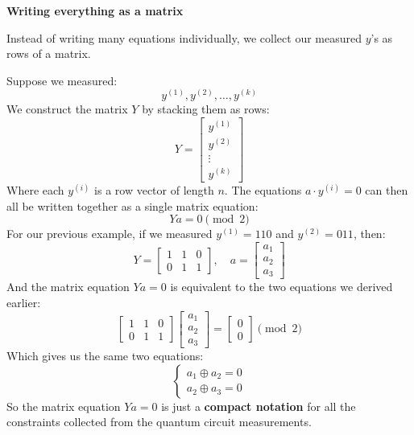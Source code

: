 \highspace
\begin{flushleft}
    \textcolor{Green3}{ \textbf{Writing everything as a matrix}}
\end{flushleft}
Instead of writing many equations individually, we collect our measured $y$'s as rows of a matrix.

\highspace
Suppose we measured:
\begin{equation*}
    y^{(1)}, y^{(2)}, \dots, y^{(k)}
\end{equation*}
We construct the matrix $Y$ by stacking them as rows:
\begin{equation*}
    Y =
    \begin{bmatrix}
        y^{(1)} \\
        y^{(2)} \\
        \vdots \\
        y^{(k)}
    \end{bmatrix}
\end{equation*}
Where each $y^{(i)}$ is a row vector of length $n$. The equations $a \cdot y^{(i)} = 0$ can then all be written together as a single matrix equation:
\begin{equation}
    Y a = 0 \pmod 2
\end{equation}
For our previous example, if we measured $y^{(1)} = 110$ and $y^{(2)} = 011$, then:
\begin{equation*}
    Y =
    \begin{bmatrix}
        1 & 1 & 0 \\
        0 & 1 & 1
    \end{bmatrix},
    \quad
    a =
    \begin{bmatrix}
        a_1 \\
        a_2 \\
        a_3
    \end{bmatrix}
\end{equation*}
And the matrix equation $Y a = 0$ is equivalent to the two equations we derived earlier:
\begin{equation*}
    \begin{bmatrix}
        1 & 1 & 0 \\
        0 & 1 & 1
    \end{bmatrix}
    \begin{bmatrix}
        a_1 \\
        a_2 \\
        a_3
    \end{bmatrix}
    =
    \begin{bmatrix}
        0 \\
        0
    \end{bmatrix}
    \pmod 2
\end{equation*}
Which gives us the same two equations:
\begin{equation*}
    \begin{cases}
        a_1 \oplus a_2 = 0 \\
        a_2 \oplus a_3 = 0
    \end{cases}
\end{equation*}
So the matrix equation $Y a = 0$ is just a \textbf{compact notation} for all the constraints collected from the quantum circuit measurements.

